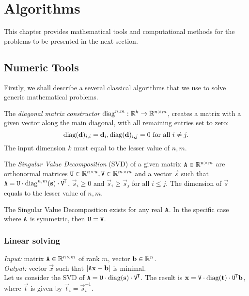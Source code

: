 \chapter{Algorithms}
\label{s:algo}
This chapter provides mathematical tools and computational methods for the problems to be presented in the next section.

\section{Numeric Tools}

Firstly, we shall describe a several classical algorithms that we use to solve generic mathematical problems.

\begin{definition}
The \textit{diagonal matrix constructor} $\mathrm{diag}^{n, m}: \mathbb{R}^k \to \mathbb{R}^{n\times m}$, creates a matrix with a given vector along the main diagonal, with all remaining entries set to zero:
$$\mathrm{diag}(\mathbf{d})_{i, i} = \mathbf{d}_i, \mathrm{diag}(\mathbf{d})_{i,j} = 0 \textrm{ for all } i \neq j.$$
The input dimension $k$ must equal to the lesser value of $n, m$.
\end{definition}

\begin{definition}
The \textit{Singular Value Decomposition} (SVD) of a given matrix $\mathtt{A} \in \mathbb{R}^{n \times m}$ are orthonormal matrices $\mathtt{U} \in \mathbb{R}^{n \times n}, \mathtt{V} \in \mathbb{R}^{m \times m}$ and a vector $\vec s$ such that $\mathtt{A} = \mathtt{U} \cdot \mathrm{diag}^{n, m}(\mathbf{s}) \cdot \mathtt{V}^{\!\mathsf{T}}$, $\vec s_i \geq 0$ and $\vec s_i \geq \vec s_j$ for all $i \leq j$.
The dimension of $\vec s$ equals to the lesser value of $n, m$.
\end{definition}

\begin{claim}
The Singular Value Decomposition exists for any real $\mathtt{A}$.
In the specific case where $\mathtt{A}$ is symmetric, then $\mathtt{U} = \mathtt{V}$.
\end{claim}

\subsection{Linear solving}
\textit{Input:} matrix $\mathtt{A} \in \mathbb{R}^{n \times m}$ of rank $m$, vector $\mathbf{b} \in \mathbb{R}^n$.\\
\textit{Output:} vector $\vec x$ such that $|\mathtt{A} \mathbf{x} - \mathbf{b}|$ is minimal.\\

Let us consider the SVD of $\mathtt{A} = \mathtt{U} \cdot \mathrm{diag}(\mathbf{s}) \cdot \mathtt{V}^{\!\mathsf{T}}$.
The result is $\mathbf{x} = \mathtt{V} \cdot \mathrm{diag}(\mathbf{t}) \cdot \mathtt{U}^{\!\mathsf{T}} \mathbf{b}$, where $\vec t$ is given by $\vec t_i = \vec s_i ^{-1}$.

